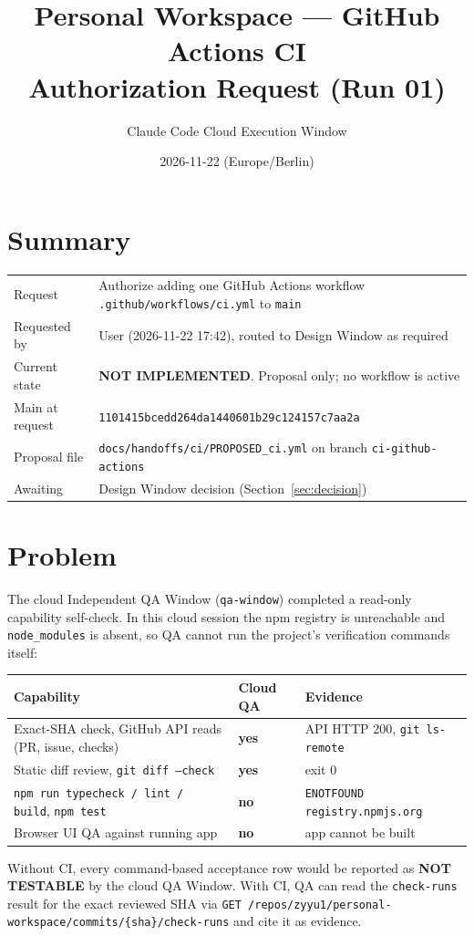 \documentclass[11pt,a4paper]{article}
\title{Personal Workspace --- GitHub Actions CI\\Authorization Request (Run 01)}
\author{Claude Code Cloud Execution Window}
\date{2026-11-22 (Europe/Berlin)}
\newcommand{\sha}[1]{\texttt{\small #1}}
\newcommand{\NO}{\textcolor{red!70!black}{\textbf{no}}}
\newcommand{\YES}{\textcolor{green!50!black}{\textbf{yes}}}
\begin{document}
\maketitle

\section*{Summary}
\begin{tabularx}{\textwidth}{@{}lX@{}}
\toprule
Request & Authorize adding one GitHub Actions workflow \texttt{.github/workflows/ci.yml} to \texttt{main} \\
Requested by & User (2026-11-22 17:42), routed to Design Window as required \\
Current state & \textbf{NOT IMPLEMENTED}. Proposal only; no workflow is active \\
Main at request & \sha{1101415bcedd264da1440601b29c124157c7aa2a} \\
Proposal file & \texttt{docs/handoffs/ci/PROPOSED\_ci.yml} on branch \texttt{ci-github-actions} \\
Awaiting & Design Window decision (Section~\ref{sec:decision}) \\
\bottomrule
\end{tabularx}

\section{Problem}
The cloud Independent QA Window (\texttt{qa-window}) completed a read-only capability self-check. In this cloud session the npm registry is unreachable and \texttt{node\_modules} is absent, so QA cannot run the project's verification commands itself:

\begin{tabularx}{\textwidth}{@{}Xll@{}}
\toprule
Capability & Cloud QA & Evidence \\
\midrule
Exact-SHA check, GitHub API reads (PR, issue, checks) & \YES & API HTTP 200, \texttt{git ls-remote} \\
Static diff review, \texttt{git diff --check} & \YES & exit 0 \\
\texttt{npm run typecheck / lint / build}, \texttt{npm test} & \NO & \texttt{ENOTFOUND registry.npmjs.org} \\
Browser UI QA against running app & \NO & app cannot be built \\
\bottomrule
\end{tabularx}

\medskip
Without CI, every command-based acceptance row would be reported as \textbf{NOT TESTABLE} by the cloud QA Window. With CI, QA can read the \texttt{check-runs} result for the exact reviewed SHA via \texttt{GET /repos/zyyu1/personal-workspace/commits/\{sha\}/check-runs} and cite it as evidence.
\end{document}
